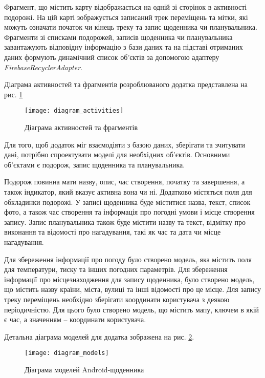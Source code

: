 \documentclass[../main.tex]{subfiles}
\begin{document}
Фрагмент, що містить карту відображається на одній зі сторінок в активності подорожі. На цій карті зображується записаний трек переміщень та мітки, які можуть означати початок чи кінець треку та запис щоденника чи планувальника. Фрагменти зі списками подорожей, записів щоденника чи планувальника завантажують відповідну інформацію з бази даних та на підставі отриманих даних формують динамічний список об'єктів за допомогою адаптеру \textit{FirebaseRecyclerAdapter}.

Діаграма активностей та фрагментів розроблюваного додатка представлена на рис. \ref{diagram:activities}

\begin{figure}[H]
	\centering
	\texttt{[image: diagram\_activities]}
	\caption{Діаграма активностей та фрагментів}
	\label{diagram:activities}
\end{figure}

Для того, щоб додаток міг взаємодіяти з базою даних, зберігати та зчитувати дані, потрібно спроектувати моделі для необхідних об'єктів. Основними об'єктами є подорож, запис щоденника та планувальника.

Подорож повинна мати назву, опис, час створення, початку та завершення, а також індикатор, який вказує активна вона чи ні. Додатково містяться поля для обкладинки подорожі. У записі щоденника буде міститися назва, текст, список фото, а також час створення та інформація про погодні умови і місце створення запису. Запис планувальника також буде містити назву та текст, відмітку про виконання та відомості про нагадування, такі як час та дата чи місце нагадування.

Для збереження інформації про погоду було створено модель, яка містить поля для температури, тиску та інших погодних параметрів. Для збереження інформації про місцезнаходження для запису щоденника, було створено модель, що містить назву країни, міста, вулиці та інші відомості про це місце. Для запису треку переміщень необхідно зберігати координати користувача з деякою періодичністю. Для цього було створено модель, що містить мапу, ключем в якій є час, а значенням -- координати користувача.

Детальна діаграма моделей для додатка зображена на рис. \ref{diagram:models}.

\begin{figure}[H]
	\centering
	\texttt{[image: diagram\_models]}
	\caption{Діаграма моделей Android-щоденника}
	\label{diagram:models}
\end{figure}
\end{document}

